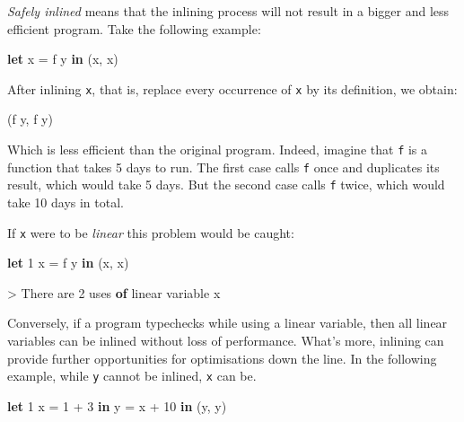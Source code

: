 \documentclass[
]{article}
\newenvironment{Shaded}{}{}
\newcommand{\DataTypeTok}[1]{\textcolor[rgb]{0.56,0.13,0.00}{#1}}
\newcommand{\DecValTok}[1]{\textcolor[rgb]{0.25,0.63,0.44}{#1}}
\newcommand{\KeywordTok}[1]{\textcolor[rgb]{0.00,0.44,0.13}{\textbf{#1}}}
\newcommand{\NormalTok}[1]{#1}
\newcommand{\OperatorTok}[1]{\textcolor[rgb]{0.40,0.40,0.40}{#1}}
\newcommand{\OtherTok}[1]{\textcolor[rgb]{0.00,0.44,0.13}{#1}}
\begin{document}
\emph{Safely inlined} means that the inlining process will not result in
a bigger and less efficient program. Take the following example:

\begin{Shaded}
\begin{Highlighting}[]
\KeywordTok{let}\NormalTok{ x }\OtherTok{=}\NormalTok{ f y }\KeywordTok{in}
\NormalTok{    (x, x)}
\end{Highlighting}
\end{Shaded}

After inlining \texttt{x}, that is, replace every occurrence of
\texttt{x} by its definition, we obtain:

\begin{Shaded}
\begin{Highlighting}[]
\NormalTok{(f y, f y)}
\end{Highlighting}
\end{Shaded}

Which is less efficient than the original program. Indeed, imagine that
\texttt{f} is a function that takes 5 days to run. The first case calls
\texttt{f} once and duplicates its result, which would take 5 days. But
the second case calls \texttt{f} twice, which would take 10 days in
total.

If \texttt{x} were to be \emph{linear} this problem would be caught:

\begin{Shaded}
\begin{Highlighting}[]
\KeywordTok{let} \DecValTok{1}\NormalTok{ x }\OtherTok{=}\NormalTok{ f y }\KeywordTok{in}
\NormalTok{    (x, x)}
\end{Highlighting}
\end{Shaded}

\begin{Shaded}
\begin{Highlighting}[]
\OperatorTok{\textgreater{}} \DataTypeTok{There}\NormalTok{ are }\DecValTok{2}\NormalTok{ uses }\KeywordTok{of}\NormalTok{ linear variable x}
\end{Highlighting}
\end{Shaded}

Conversely, if a program typechecks while using a linear variable, then
all linear variables can be inlined without loss of performance. What's
more, inlining can provide further opportunities for optimisations down
the line. In the following example, while \texttt{y} cannot be inlined,
\texttt{x} can be.

\begin{Shaded}
\begin{Highlighting}[]
\KeywordTok{let} \DecValTok{1}\NormalTok{ x }\OtherTok{=} \DecValTok{1} \OperatorTok{+} \DecValTok{3} \KeywordTok{in}
\NormalTok{    y }\OtherTok{=}\NormalTok{ x }\OperatorTok{+} \DecValTok{10} \KeywordTok{in}
\NormalTok{    (y, y)}
\end{Highlighting}
\end{Shaded}
\end{document}
